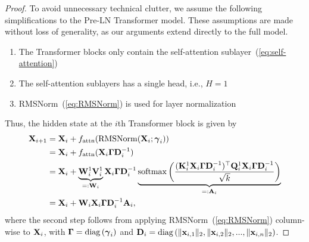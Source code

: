 \documentclass[journal]{IEEEtran}
\newcommand{\bfA}{{\bf A}}
\newcommand{\bfD}{{\bf D}}
\newcommand{\bfK}{{\bf K}}
\newcommand{\bfQ}{{\bf Q}}
\newcommand{\bfV}{{\bf V}}
\newcommand{\bfW}{{\bf W}}
\newcommand{\bfX}{{\bf X}}
\newcommand{\bfx}{{\bf x}}
\newcommand{\bfgamma}{{\boldsymbol \gamma}}
\newcommand{\bfGamma}{{\boldsymbol \Gamma}}
\theoremstyle{plain}
\theoremstyle{definition}
\theoremstyle{remark}
\begin{document}
\begin{proof}
    To avoid unnecessary technical clutter, we assume the following simplifications to the Pre-LN Transformer model. These assumptions are made without loss of generality, as our arguments extend directly to the full model.
    \begin{enumerate}
        \item The Transformer blocks only contain the self-attention sublayer~(\ref{eq:self-attention})
        \item The self-attention sublayers has a single head, i.e., $H=1$
        \item RMSNorm~(\ref{eq:RMSNorm}) is used for layer normalization
    \end{enumerate}
    Thus, the hidden state at the $i$th Transformer block is given by
    \begin{align}
        \bfX_{i+1} &= \bfX_i + f_{\rm attn}( {\rm RMSNorm}(\bfX_i; \bfgamma_i) )\\
        &= \bfX_i + f_{\rm attn}( \bfX_i \bfGamma \bfD_i^{-1} ) \\
        &= \bfX_i + \underbrace{\bfW_i^1 \bfV_i^1}_{=:\bfW_i} \bfX_i \bfGamma \bfD_i^{-1} \underbrace{{\rm softmax} \left( \frac{(\bfK_i^1 \bfX_i \bfGamma \bfD_i^{-1})^\top \bfQ_i^1 \bfX_i \bfGamma \bfD_i^{-1}}{\sqrt{k}} \right)}_{=:\bfA_i} \\
        &= \bfX_i + \bfW_i {\bfX}_i \bfGamma \bfD_i^{-1} \bfA_i \label{eq:PreLN_Tran_sim},
    \end{align}
    where the second step follows from applying RMSNorm~(\ref{eq:RMSNorm}) column-wise to $\bfX_i$, with $\bfGamma= {\rm diag} \left( \bfgamma_i \right)$ and $\bfD_i = {\rm diag} \left( \|\bfx_{i,1}\|_2, \|\bfx_{i,2}\|_2, ..., \|\bfx_{i,n}\|_2 \right)$.



\end{proof}
\end{document}
